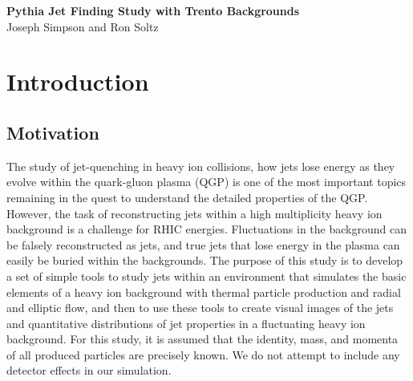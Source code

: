 \documentclass[11pt]{article}
\begin{document}
%
%
\newcommand{\zapspace}{\topsep=1pt\partopsep=1pt\itemsep=1pt\parskip=2pt}
\newcommand{\trento}{\mbox{T$_{\rm R}$ENTo}}

\begin{center}
{\Large \bf Pythia Jet Finding Study with Trento Backgrounds\\}
\bigskip
Joseph Simpson and Ron Soltz
\end{center}

\begin{abstract}
We present results applying the Pythia SlowJet Finder to Pythia generated QCD and QED hard processes in the presence of simulated heavy ion backgrounds.  The hard process events are generated with Pythia version~8.219 for $\sqrt{s_{NN}}$=200~GeV proton-proton collisions and the backgrounds are generated by the Reduced Thickness Event-by-event Nuclear Topology model \trento\ for Au-Au collisions with a nucleon-nucleon cross-section of 4.23~fm$^2$.  The \trento\ model is used to calculate the initial entropy and ellipticity from which the total charged particle multiplicity and elliptic flow are determined.  We report results in the form of event displays, total $p_T$ distributions, and fragmentation distributions for SlowJet applied to Pythia events with and without the simulated heavy ion backgrounds.
\end{abstract}

\tableofcontents

\newpage 

\section{Introduction}
\subsection*{Motivation}

The study of jet-quenching in heavy ion collisions, how jets lose energy as they evolve within the quark-gluon plasma (QGP) is one of the most important topics remaining in the quest to understand the detailed properties of the QGP.  However, the task of reconstructing jets within a high multiplicity heavy ion background is a challenge for RHIC energies.  Fluctuations in the background can be falsely reconstructed as jets, and true jets that lose energy in the plasma can easily be buried within the backgrounds.  The purpose of this study is to develop a set of simple tools to study jets within an environment that simulates the basic elements of a heavy ion background with thermal particle production and radial and elliptic flow, and then to use these tools to create visual images of the jets and quantitative distributions of jet properties in a fluctuating heavy ion background.  For this study, it is assumed that the identity, mass, and momenta of all produced particles are precisely known.  We do not attempt to include any detector effects in our simulation.
\end{document}
